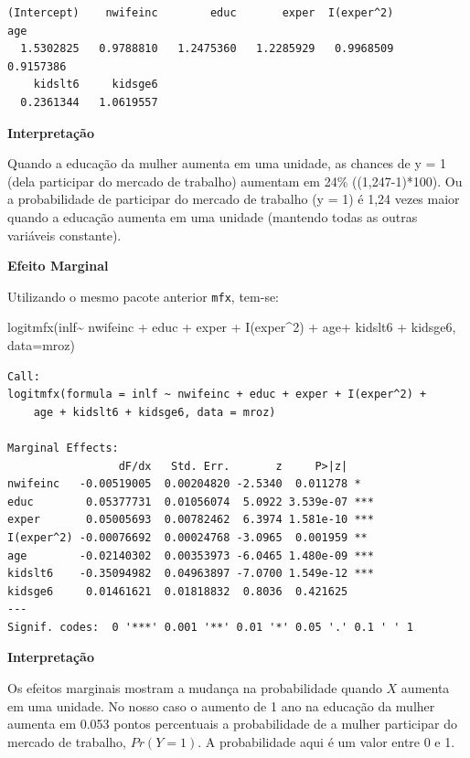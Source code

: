 \documentclass[
  letterpaper,
  DIV=11,
  numbers=noendperiod]{scrreprt}
\newenvironment{Shaded}{\begin{snugshade}}{\end{snugshade}}
\newcommand{\AttributeTok}[1]{\textcolor[rgb]{0.40,0.45,0.13}{#1}}
\newcommand{\DecValTok}[1]{\textcolor[rgb]{0.68,0.00,0.00}{#1}}
\newcommand{\FunctionTok}[1]{\textcolor[rgb]{0.28,0.35,0.67}{#1}}
\newcommand{\NormalTok}[1]{\textcolor[rgb]{0.00,0.23,0.31}{#1}}
\newcommand{\SpecialCharTok}[1]{\textcolor[rgb]{0.37,0.37,0.37}{#1}}
\begin{document}
\begin{verbatim}
(Intercept)    nwifeinc        educ       exper  I(exper^2)         age 
  1.5302825   0.9788810   1.2475360   1.2285929   0.9968509   0.9157386 
    kidslt6     kidsge6 
  0.2361344   1.0619557 
\end{verbatim}

\textbf{Interpretação}

Quando a educação da mulher aumenta em uma unidade, as chances de y = 1
(dela participar do mercado de trabalho) aumentam em 24\%
((1,247-1)*100). Ou a probabilidade de participar do mercado de trabalho
(y = 1) é 1,24 vezes maior quando a educação aumenta em uma unidade
(mantendo todas as outras variáveis constante).

\textbf{Efeito Marginal}

Utilizando o mesmo pacote anterior \texttt{mfx}, tem-se:

\begin{Shaded}
\begin{Highlighting}[]
\FunctionTok{logitmfx}\NormalTok{(inlf}\SpecialCharTok{\textasciitilde{}}\NormalTok{ nwifeinc }\SpecialCharTok{+}\NormalTok{ educ }\SpecialCharTok{+}\NormalTok{ exper }\SpecialCharTok{+} \FunctionTok{I}\NormalTok{(exper}\SpecialCharTok{\^{}}\DecValTok{2}\NormalTok{) }\SpecialCharTok{+} 
\NormalTok{                  age}\SpecialCharTok{+}\NormalTok{ kidslt6 }\SpecialCharTok{+}\NormalTok{ kidsge6, }\AttributeTok{data=}\NormalTok{mroz)}
\end{Highlighting}
\end{Shaded}

\begin{verbatim}
Call:
logitmfx(formula = inlf ~ nwifeinc + educ + exper + I(exper^2) + 
    age + kidslt6 + kidsge6, data = mroz)

Marginal Effects:
                 dF/dx   Std. Err.       z     P>|z|    
nwifeinc   -0.00519005  0.00204820 -2.5340  0.011278 *  
educ        0.05377731  0.01056074  5.0922 3.539e-07 ***
exper       0.05005693  0.00782462  6.3974 1.581e-10 ***
I(exper^2) -0.00076692  0.00024768 -3.0965  0.001959 ** 
age        -0.02140302  0.00353973 -6.0465 1.480e-09 ***
kidslt6    -0.35094982  0.04963897 -7.0700 1.549e-12 ***
kidsge6     0.01461621  0.01818832  0.8036  0.421625    
---
Signif. codes:  0 '***' 0.001 '**' 0.01 '*' 0.05 '.' 0.1 ' ' 1
\end{verbatim}

\textbf{Interpretação}

Os efeitos marginais mostram a mudança na probabilidade quando \(X\)
aumenta em uma unidade. No nosso caso o aumento de 1 ano na educação da
mulher aumenta em 0.053 pontos percentuais a probabilidade de a mulher
participar do mercado de trabalho, \(Pr(Y=1)\). A probabilidade aqui é
um valor entre 0 e 1.
\end{document}
